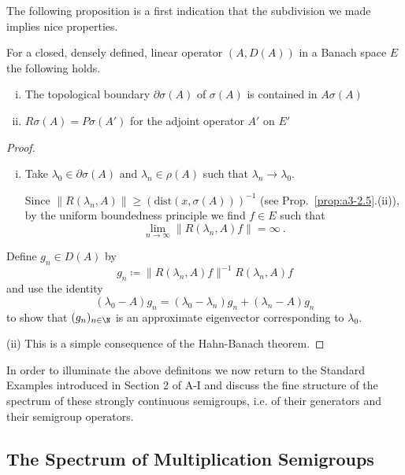 The following proposition is a first indication that the subdivision we made implies nice properties.
\begin{proposition}\label{prop:a3-3.6}
For a closed, densely defined, linear operator $(A,D(A))$ in a Banach space $E$ the following holds.
\begin{enumerate}[(i)]

\item 
The topological boundary $\partial\sigma(A)$ of $\sigma(A)$ is contained in $A\sigma(A)$

\item 
$R\sigma(A) = P\sigma(A')$ for the adjoint operator $A'$ on $E'$

\end{enumerate}
\end{proposition}
\begin{proof}
\begin{enumerate}[(i)]

\item Take $\lambda_{0} \in \partial\sigma(A)$ and $\lambda_{n} \in \rho(A)$ such that $\lambda_{n} \to \lambda_{0}$.

Since $\|R(\lambda_{n},A)\| \geq (\text{dist}(x,\sigma(A)))^{-1}$ (see Prop.~\ref{prop:a3-2.5}.(ii)), by the uniform boundedness principle we find $f \in E$ such that 
\[
\lim_{n \to \infty}\|R(\lambda_n ,A)f\| = \infty~.
\]
\end{enumerate}
%
%
%
Define $g_{n} \in D(A)$ by
\[
g_{n} \coloneqq \|R(\lambda_{n},A)f\|^{-1} R(\lambda_{n},A)f
\]
and use the identity
\[
(\lambda_{0} - A)g_{n} = (\lambda_{0} - \lambda_{n})g_{n} + (\lambda_{n} - A)g_{n}
\]
to show that $(g_{n})_{n \in \N}$ is an approximate eigenvector corresponding to $\lambda_{0}$.
 
(ii) This is a simple consequence of the Hahn-Banach theorem.
\end{proof}

In order to illuminate the above definitons we now return to the Standard Examples introduced in Section 2 of A-I and discuss the fine structure of the spectrum of these strongly continuous semigroups, i.e. of their generators and their semigroup operators.

\subsection{The Spectrum of Multiplication Semigroups}\label{subsec:a3-2.3}

